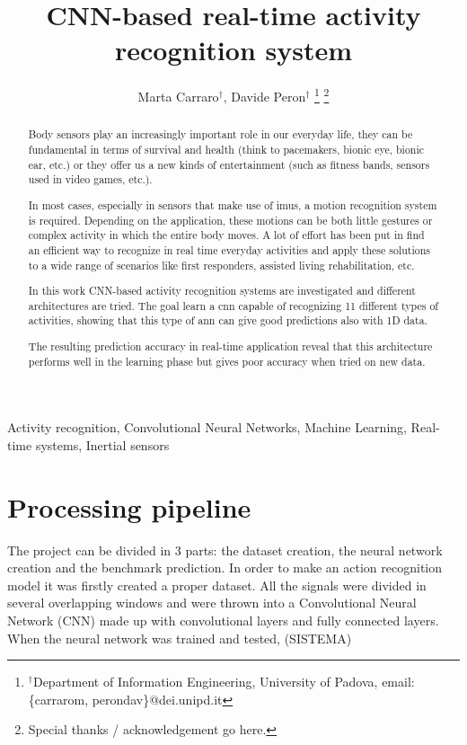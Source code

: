 \documentclass[10pt, conference, letterpaper]{IEEEtran}
\title{CNN-based real-time activity recognition system}
\author{Marta Carraro$^\dag$, Davide Peron$^\dag$
\thanks{$^\dag$Department of Information Engineering, University of Padova, email: \{carrarom, perondav\}@dei.unipd.it}
\thanks{Special thanks / acknowledgement go here.}
}
\begin{document}
\maketitle

\begin{abstract}
Body sensors play an increasingly important role in our everyday life, they can be fundamental in terms of survival and health (think to pacemakers, bionic eye, bionic ear, etc.) or they offer us a new kinds of entertainment (such as fitness bands, sensors used in video games, etc.).

In most cases, especially in sensors that make use of \glspl{imu}, a motion recognition system is required. Depending on the application, these motions can be both little gestures or complex activity in which the entire body moves.
A lot of effort has been put in find an efficient way to recognize in real time everyday activities and apply these solutions to a wide range of scenarios like first responders, assisted living rehabilitation, etc.

In this work CNN-based activity recognition systems are investigated and different architectures are tried. The goal learn a \gls{cnn} capable of recognizing 11 different types of activities, showing that this type of \gls{ann} can give good predictions also with 1D data.

The resulting prediction accuracy in real-time application reveal that this architecture performs well in the learning phase but gives poor accuracy when tried on new data.
\end{abstract}





\IEEEkeywords
Activity recognition, Convolutional Neural Networks, Machine Learning, Real-time systems, Inertial sensors
\endIEEEkeywords


\section{Processing pipeline}
The project can be divided in 3 parts: the dataset creation, the neural network creation and the benchmark prediction.
In order to make an action recognition model it was firstly created a proper dataset. All the signals were divided in several overlapping windows and were thrown into a Convolutional Neural Network (CNN) made up with convolutional layers and fully connected layers.
When the neural network was trained and tested, (SISTEMA)
\end{document}
